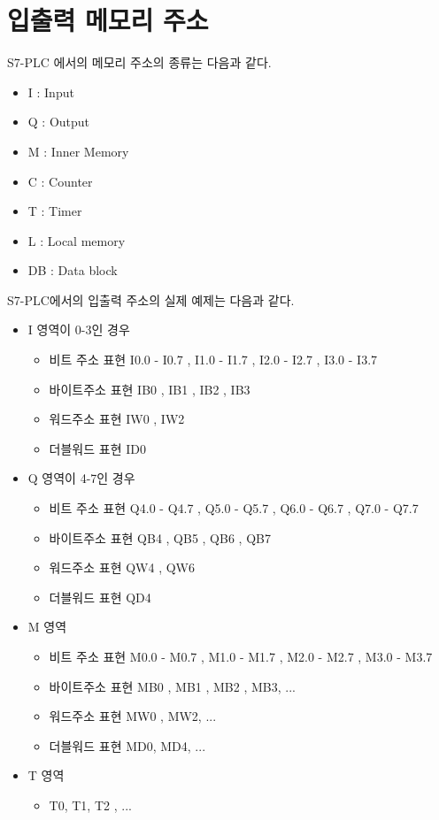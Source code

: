 \documentclass[11pt
  , a4paper
  , article
  , oneside
]{memoir}
\begin{document}
\section{입출력 메모리 주소}
S7-PLC 에서의 메모리 주소의 종류는 다음과 같다.
\begin{itemize}
\item I : Input
\item Q : Output
\item M : Inner Memory 
\item C : Counter
\item T : Timer
\item L : Local memory
\item DB : Data block
\end{itemize} 
S7-PLC에서의 입출력 주소의 실제 예제는 다음과 같다.
\begin{itemize}
\item I 영역이 0-3인 경우
\begin{itemize}
\item 비트 주소 표현 I0.0 - I0.7 , I1.0 - I1.7 , I2.0 - I2.7 , I3.0 - I3.7
\item 바이트주소 표현 IB0 , IB1 , IB2 , IB3
\item 워드주소 표현 IW0 , IW2
\item 더블워드 표현 ID0 
\end{itemize}
\item Q 영역이 4-7인 경우
\begin{itemize}
\item 비트 주소 표현 Q4.0 - Q4.7 , Q5.0 - Q5.7 , Q6.0 - Q6.7 , Q7.0 - Q7.7
\item 바이트주소 표현 QB4 , QB5 , QB6 , QB7
\item 워드주소 표현 QW4 , QW6
\item 더블워드 표현 QD4 
\end{itemize}
\item M 영역
\begin{itemize}
\item 비트 주소 표현 M0.0 - M0.7 , M1.0 - M1.7 , M2.0 - M2.7 , M3.0 - M3.7
\item 바이트주소 표현 MB0 , MB1 , MB2 , MB3, ...
\item 워드주소 표현 MW0 , MW2, ...
\item 더블워드 표현 MD0, MD4, ... 
\end{itemize}
\item T 영역
\begin{itemize}
\item T0, T1, T2 , ...
\end{itemize}

\end{itemize}
\end{document}
